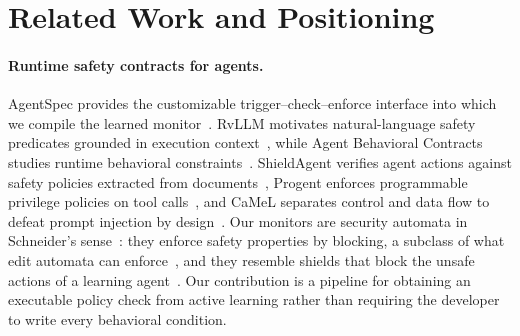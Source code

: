 \section{Related Work and Positioning}
\paragraph{Runtime safety contracts for agents.}
AgentSpec provides the customizable trigger--check--enforce interface into which we compile the learned monitor~\cite{wang2026agentspec}. RvLLM motivates natural-language safety predicates grounded in execution context~\cite{zhang2025rvllm}, while Agent Behavioral Contracts studies runtime behavioral constraints~\cite{bhardwaj2026abc}. ShieldAgent verifies agent actions against safety policies extracted from documents~\cite{chen2025shieldagent}, Progent enforces programmable privilege policies on tool calls~\cite{shi2025progent}, and CaMeL separates control and data flow to defeat prompt injection by design~\cite{debenedetti2025camel}. Our monitors are security automata in Schneider's sense~\cite{schneider2000enforceable}: they enforce safety properties by blocking, a subclass of what edit automata can enforce~\cite{ligatti2005edit}, and they resemble shields that block the unsafe actions of a learning agent~\cite{alshiekh2018shielding}. Our contribution is a pipeline for obtaining an executable policy check from active learning rather than requiring the developer to write every behavioral condition.

